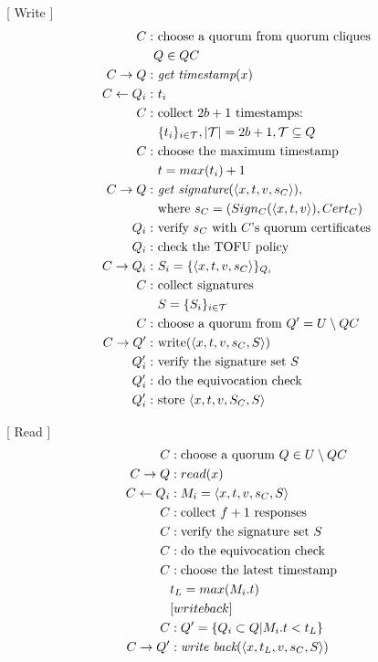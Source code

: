 [ Write ]
\begin{align*}
  C :& \text{ choose a quorum from quorum cliques} \\
     & Q \in QC \\
  C \rightarrow Q :& \text{ {\em get timestamp}}(x) \\
  C \leftarrow Q_i :& \text{ } t_i \\
  C :& \text{ collect } 2b+1 \text{ timestamps: } \\
     & \text{ } \{t_i\}_{i \in \mathcal{T}}, |\mathcal{T}|=2b+1,
       \mathcal{T} \subseteq Q \\
  C :& \text{ choose the maximum timestamp } \\
     & \text{ } t = max(t_i) + 1 \\
  C \rightarrow Q :& \text{ {\em get signature}}(\langle x, t, v, s_C \rangle),\\
     & \text{ where } s_C = (Sign_C(\langle x, t, v \rangle), Cert_C) \\
  Q_i :& \text{ verify $s_C$ with $C$'s quorum certificates} \\
  Q_i :& \text{ check the TOFU policy} \\
  C \rightarrow Q_i :& \text{ } S_i = \{\langle x, t, v, s_C \rangle\}_{Q_i} \\
  C :& \text{ collect signatures } \\
     & \text{ } S = \{S_i\}_{i \in \mathcal{T}} \\
  C :& \text{ choose a quorum from } Q' = U \setminus QC \\
  C \rightarrow Q' :& \text{ write}(\langle x, t, v, s_C, S \rangle) \\
  Q'_i :& \text{ verify the signature set $S$} \\
  Q'_i :& \text{ do the equivocation check} \\
  Q'_i :& \text{ store } \langle x, t, v, S_C, S \rangle
\end{align*}

[ Read ]
\setcounter{equation}{0}
\begin{align*}
  C &: \text{choose a quorum } Q \in U \setminus QC \\
  C \rightarrow Q &: read(x) \\
  C \leftarrow Q_i &: M_i = \langle x, t, v, s_C, S \rangle \\
  C &: \text{collect } f + 1 \text{ responses} \\
  C &: \text{verify the signature set $S$} \\
  C &: \text{do the equivocation check} \\
  C &: \text{choose the latest timestamp } \\
    & t_L = max(M_i.t) \\
    & [ write back ] \\
  C &: Q' = \{Q_i \subset Q | M_i.t < t_L\} \\
  C \rightarrow Q' &: \text{{\em write back}}(\langle x, t_L, v, s_C, S \rangle)
\end{align*}


